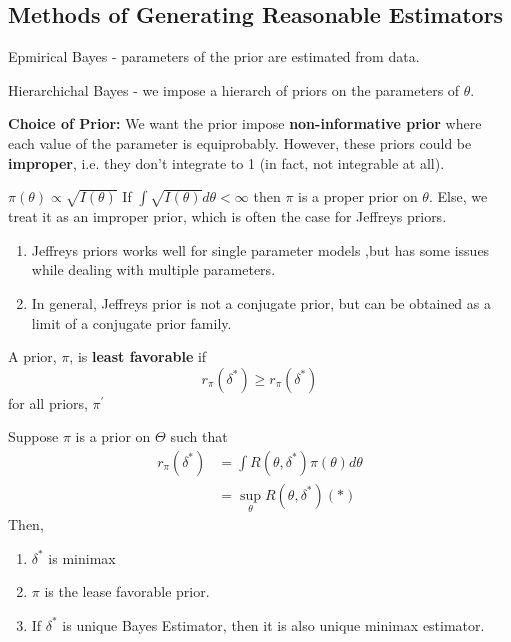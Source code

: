 \documentclass[11pt,fleqn]{book} %
\begin{document}
\subsection{Methods of Generating Reasonable Estimators}

Epmirical Bayes - parameters of the prior are estimated from data.

Hierarchichal Bayes - we impose a hierarch of priors on the parameters of $\theta$.

\textbf{Choice of Prior:} We want the prior impose \textbf{non-informative prior} where each value of the parameter is equiprobably. However, these priors could be \textbf{improper}, i.e. they don't integrate to 1 (in fact, not integrable at all). 

\begin{definition}
	$\pi(\theta) \propto \sqrt{I(\theta)}$ If $\int \sqrt{I(\theta)} d\theta < \infty$ then $\pi$ is a proper prior on $\theta$. Else, we treat it as an improper prior, which is often the case for Jeffreys priors.
	\begin{remark}
		\begin{enumerate}
			\item Jeffreys priors works well for single parameter models ,but has some issues while dealing with multiple parameters.
			\item In general, Jeffreys prior is not a conjugate prior, but can be obtained as a limit of a conjugate prior family.
		\end{enumerate}
	\end{remark}
\end{definition}

\begin{definition}
	A prior, $\pi$, is \textbf{least favorable} if
	$$r_\pi(\delta^*) \ge r_\pi(\delta^*)$$ for all priors, $\pi^\prime$
\end{definition}

\begin{theorem}
	Suppose $\pi$ is a prior on $\Theta$ such that
	\begin{align*}
		r_\pi(\delta^*) &= \int R(\theta, \delta^*) \pi(\theta) d\theta\\
		&= \sup_\theta R(\theta, \delta^*) (*)
	\end{align*}
	Then, 
	\begin{enumerate}[label = \alph*)]
		\item $\delta^*$ is minimax
		\item $\pi$ is the lease favorable prior.
		\item If $\delta^*$ is unique Bayes Estimator, then it is also unique minimax estimator.	
	\end{enumerate}
\end{theorem}
\end{document}
